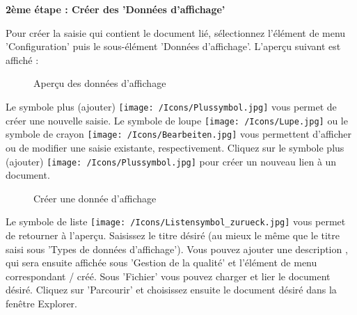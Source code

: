 \textbf{2ème étape : Créer des 'Données d'affichage'}

Pour créer la saisie qui contient le document lié, sélectionnez l'élément de menu 'Configuration' puis le sous-élément 'Données d'affichage'. L'aperçu suivant est affiché : 

\begin{figure}[H]
\caption{Aperçu des données d'affichage}
\end{figure}

Le symbole plus (ajouter) \texttt{[image: /Icons/Plussymbol.jpg]}  vous permet de créer une nouvelle saisie. Le symbole de loupe \texttt{[image: /Icons/Lupe.jpg]}  ou le symbole de crayon \texttt{[image: /Icons/Bearbeiten.jpg]}  vous permettent d'afficher ou de modifier une saisie existante, respectivement. Cliquez sur le symbole plus (ajouter) \texttt{[image: /Icons/Plussymbol.jpg]}  pour créer un nouveau lien à un document.

\begin{figure}[H]
\caption{Créer une donnée d'affichage}
\end{figure}

Le symbole de liste \texttt{[image: /Icons/Listensymbol\_zurueck.jpg]}  vous permet de retourner à l'aperçu. Saisissez le titre désiré  (au mieux le même que le titre saisi sous 'Types de données d'affichage'). Vous pouvez ajouter une description , qui sera ensuite affichée sous 'Gestion de la qualité' et l'élément de menu correspondant / créé. Sous 'Fichier'  vous pouvez charger et lier le document désiré. Cliquez sur 'Parcourir' et choisissez ensuite le document désiré dans la fenêtre Explorer.\\

